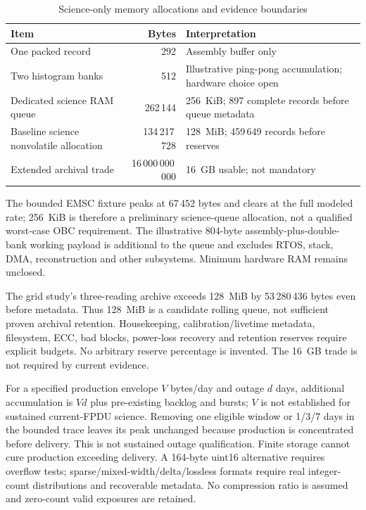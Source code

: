 \begin{table}[H]\centering\small
\caption{Science-only memory allocations and evidence boundaries}\label{tab:science-memory}
\begin{tabularx}{\linewidth}{@{}>{\raggedright\arraybackslash}p{4.1cm}rX@{}}\toprule Item & Bytes & Interpretation\\\midrule
One packed record & 292 & Assembly buffer only\\
Two histogram banks & 512 & Illustrative ping-pong accumulation; hardware choice open\\
Dedicated science RAM queue & 262\,144 & 256~KiB; 897 complete records before queue metadata\\
Baseline science nonvolatile allocation & 134\,217\,728 & 128~MiB; 459\,649 records before reserves\\
Extended archival trade & 16\,000\,000\,000 & 16~GB usable; not mandatory\\\bottomrule\end{tabularx}
\end{table}
The bounded EMSC fixture peaks at 67\,452 bytes and clears at the full modeled rate; 256~KiB is therefore a preliminary science-queue allocation, not a qualified worst-case OBC requirement. The illustrative 804-byte assembly-plus-double-bank working payload is additional to the queue and excludes RTOS, stack, DMA, reconstruction and other subsystems. Minimum hardware RAM remains unclosed.

The grid study's three-reading archive exceeds 128~MiB by 53\,280\,436 bytes even before metadata. Thus 128~MiB is a candidate rolling queue, not sufficient proven archival retention. Housekeeping, calibration/livetime metadata, filesystem, ECC, bad blocks, power-loss recovery and retention reserves require explicit budgets. No arbitrary reserve percentage is invented. The 16~GB trade is not required by current evidence.

For a specified production envelope $V$ bytes/day and outage $d$ days, additional accumulation is $Vd$ plus pre-existing backlog and bursts; $V$ is not established for sustained current-FPDU science. Removing one eligible window or 1/3/7 days in the bounded trace leaves its peak unchanged because production is concentrated before delivery. This is not sustained outage qualification. Finite storage cannot cure production exceeding delivery. A 164-byte uint16 alternative requires overflow tests; sparse/mixed-width/delta/lossless formats require real integer-count distributions and recoverable metadata. No compression ratio is assumed and zero-count valid exposures are retained.

